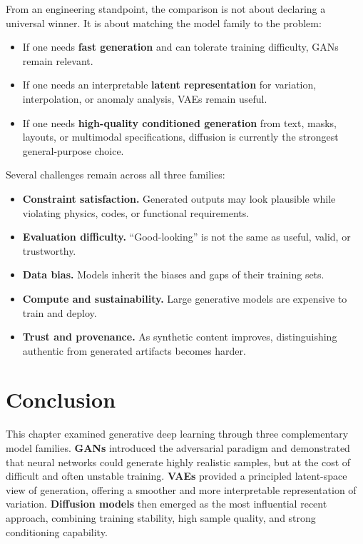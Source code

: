 \documentclass[12pt]{article}
\begin{document}
From an engineering standpoint, the comparison is not about declaring a universal winner. It is about matching the model family to the problem:
\begin{itemize}
    \item If one needs \textbf{fast generation} and can tolerate training difficulty, GANs remain relevant.
    \item If one needs an interpretable \textbf{latent representation} for variation, interpolation, or anomaly analysis, VAEs remain useful.
    \item If one needs \textbf{high-quality conditioned generation} from text, masks, layouts, or multimodal specifications, diffusion is currently the strongest general-purpose choice.
\end{itemize}

Several challenges remain across all three families:
\begin{itemize}
    \item \textbf{Constraint satisfaction.} Generated outputs may look plausible while violating physics, codes, or functional requirements.
    \item \textbf{Evaluation difficulty.} ``Good-looking'' is not the same as useful, valid, or trustworthy.
    \item \textbf{Data bias.} Models inherit the biases and gaps of their training sets.
    \item \textbf{Compute and sustainability.} Large generative models are expensive to train and deploy.
    \item \textbf{Trust and provenance.} As synthetic content improves, distinguishing authentic from generated artifacts becomes harder.
\end{itemize}

\section{Conclusion}

This chapter examined generative deep learning through three complementary model families. \textbf{GANs} introduced the adversarial paradigm and demonstrated that neural networks could generate highly realistic samples, but at the cost of difficult and often unstable training. \textbf{VAEs} provided a principled latent-space view of generation, offering a smoother and more interpretable representation of variation. \textbf{Diffusion models} then emerged as the most influential recent approach, combining training stability, high sample quality, and strong conditioning capability.
\end{document}
